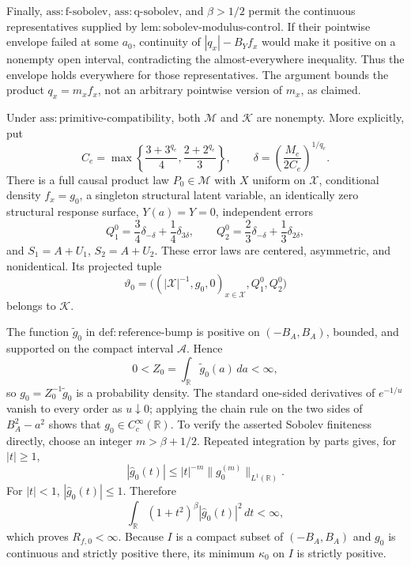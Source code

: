 Finally, \(\mathrm{ass{:}f\text{-}sobolev}\), \(\mathrm{ass{:}q\text{-}sobolev}\), and \(\beta>1/2\) permit the continuous representatives supplied by \(\mathrm{lem{:}sobolev\text{-}modulus\text{-}control}\).  If their pointwise envelope failed at some \(a_0\), continuity of \(|q_x|-B_Yf_x\) would make it positive on a nonempty open interval, contradicting the almost-everywhere inequality.  Thus the envelope holds everywhere for those representatives.  The argument bounds the product \(q_x=m_xf_x\), not an arbitrary pointwise version of \(m_x\), as claimed.

Under \(\mathrm{ass{:}primitive\text{-}compatibility}\), both \(\mathcal M\) and \(\mathscr K\) are nonempty.  More explicitly, put
\[
 C_e=\max\left\{\frac{3+3^{q_e}}4,\frac{2+2^{q_e}}3\right\},
 \qquad
 \delta=\left(\frac{M_e}{2C_e}\right)^{1/q_e}.
\]
There is a full causal product law \(P_0\in\mathcal M\) with \(X\) uniform on \(\mathcal X\), conditional density \(f_x=g_0\), a singleton structural latent variable, an identically zero structural response surface, \(Y(a)=Y=0\), independent errors
\[
 Q_1^0=\frac34\delta_{-\delta}+\frac14\delta_{3\delta},
 \qquad
 Q_2^0=\frac23\delta_{-\delta}+\frac13\delta_{2\delta},
\]
and \(S_1=A+U_1\), \(S_2=A+U_2\).  These error laws are centered, asymmetric, and nonidentical.  Its projected tuple
\[
 \vartheta_0=\bigl((|\mathcal X|^{-1},g_0,0)_{x\in\mathcal X},Q_1^0,Q_2^0\bigr)
\]
belongs to \(\mathscr K\).

The function \(\widetilde g_0\) in \(\mathrm{def{:}reference\text{-}bump}\) is positive on \((-B_A,B_A)\), bounded, and supported on the compact interval \(\mathcal A\).  Hence
\[
 0<Z_0=\int_{\mathbb R}\widetilde g_0(a)\,da<\infty,
\]
so \(g_0=Z_0^{-1}\widetilde g_0\) is a probability density.  The standard one-sided derivatives of \(e^{-1/u}\) vanish to every order as \(u\downarrow0\); applying the chain rule on the two sides of \(B_A^2-a^2\) shows that \(g_0\in C_c^\infty(\mathbb R)\).  To verify the asserted Sobolev finiteness directly, choose an integer \(m>\beta+1/2\).  Repeated integration by parts gives, for \(|t|\ge1\),
\[
 |\widehat g_0(t)|
 \le |t|^{-m}\|g_0^{(m)}\|_{L^1(\mathbb R)}.
\]
For \(|t|<1\), \(|\widehat g_0(t)|\le1\).  Therefore
\[
 \int_{\mathbb R}(1+t^2)^\beta|\widehat g_0(t)|^2\,dt<\infty,
\]
which proves \(R_{f,0}<\infty\).  Because \(I\) is a compact subset of \((-B_A,B_A)\) and \(g_0\) is continuous and strictly positive there, its minimum \(\kappa_0\) on \(I\) is strictly positive.

